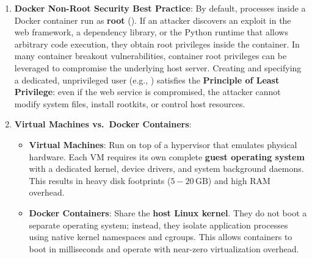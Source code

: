\begin{enumerate}
    \item \textbf{Docker Non-Root Security Best Practice}:
    By default, processes inside a Docker container run as \textbf{root} (). If an attacker discovers an exploit in the web framework, a dependency library, or the Python runtime that allows arbitrary code execution, they obtain root privileges inside the container. In many container breakout vulnerabilities, container root privileges can be leveraged to compromise the underlying host server. Creating and specifying a dedicated, unprivileged user (e.g., ) satisfies the \textbf{Principle of Least Privilege}: even if the web service is compromised, the attacker cannot modify system files, install rootkits, or control host resources.

    \item \textbf{Virtual Machines vs.\ Docker Containers}:
    \begin{itemize}
        \item \textbf{Virtual Machines}: Run on top of a hypervisor that emulates physical hardware. Each VM requires its own complete \textbf{guest operating system} with a dedicated kernel, device drivers, and system background daemons. This results in heavy disk footprints ($5 - 20\,\text{GB}$) and high RAM overhead.
        \item \textbf{Docker Containers}: Share the \textbf{host Linux kernel}. They do not boot a separate operating system; instead, they isolate application processes using native kernel namespaces and cgroups. This allows containers to boot in milliseconds and operate with near-zero virtualization overhead.
    \end{itemize}
\end{enumerate}
